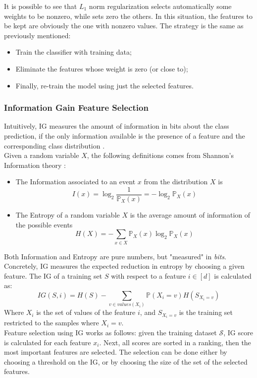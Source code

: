 It is possible to see that $L_1$ norm regularization selects automatically some weights to be nonzero, while sets zero the others. In this situation, the features to be kept are obviously the one with nonzero values. The strategy is the same as previously mentioned:

\begin{itemize}
	\item Train the classifier with training data;
	\item Eliminate the features whose weight is zero (or close to);
	\item Finally, re-train the model using just the selected features.
\end{itemize}



\subsubsection{Information Gain Feature Selection}

Intuitively, \ac{IG} measures the amount of information in bits about the class prediction, if the only information available is the presence of a feature and the corresponding class distribution \cite{Roobaert_chapter22}.\\
Given a random variable $X$, the following definitions comes from Shannon's Information theory \cite{Shannon1948}:
\begin{itemize}
	\item The Information associated to an event $x$ from the distribution $X$ is
	\[ I(x) = \log_2 \frac{1}{\mathbb{P}_X(x)} = - \log_2 \mathbb{P}_X(x) \]
	\item The Entropy of a random variable $X$ is the average amount of information of the possible events
	\[ H(X) = - \sum_{x \in X} \mathbb{P}_X(x) \log_2 \mathbb{P}_X(x) \]
\end{itemize}

Both Information and Entropy are pure numbers, but "measured" in \textit{bits}.\\
Concretely, \ac{IG} measures the expected reduction in entropy by choosing a given feature. The \ac{IG} of a training set $S$ with respect to a feature $i \in [d]$ is calculated as:
\[ IG(S, i) = H(S) - \sum_{v \in values(X_i)} \mathbb{P}(X_i = v) H(S_{X_i=v}) \]
Where $X_i$ is the set of values of the feature $i$, and $S_{X_i=v}$ is the training set restricted to the samples where $X_i=v$.\\
Feature selection using \ac{IG} works as follows: given the training dataset $\mathcal{S}$, \ac{IG} score is calculated for each feature $x_i$. Next, all scores are sorted in a ranking, then the most important features are selected. The selection can be done either by choosing a threshold on the \ac{IG}, or by choosing the size of the set of the selected features.\\



